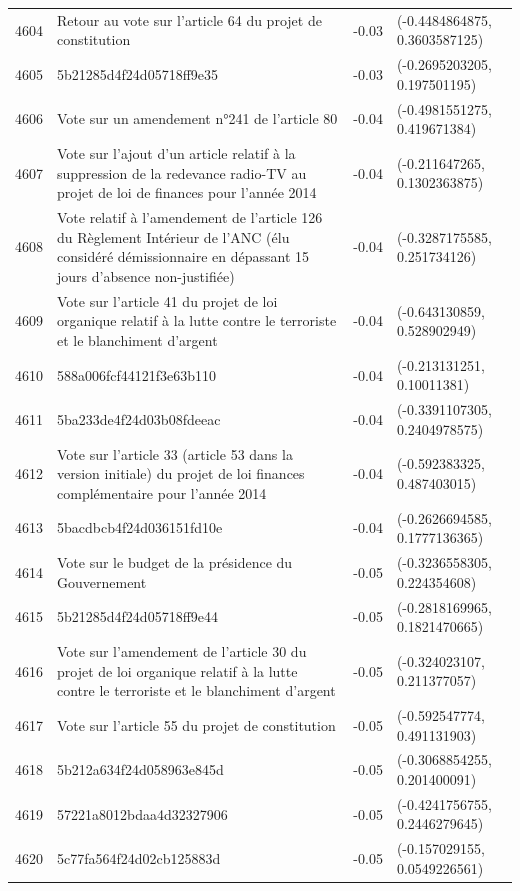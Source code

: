 \begin{table}[ht]
\begin{tabular}{rlrl}
  4604 & Retour au vote sur l'article 64 du projet de constitution & -0.03 & (-0.4484864875, 0.3603587125) \\ 
  4605 & 5b21285d4f24d05718ff9e35 & -0.03 & (-0.2695203205, 0.197501195) \\ 
  4606 & Vote sur un amendement n°241 de l'article 80 & -0.04 & (-0.4981551275, 0.419671384) \\ 
  4607 & Vote sur l'ajout d'un article relatif à la suppression de la redevance radio-TV au projet de loi de finances pour l'année 2014 & -0.04 & (-0.211647265, 0.1302363875) \\ 
  4608 & Vote relatif à l'amendement de l'article 126 du Règlement Intérieur de l'ANC (élu considéré démissionnaire en dépassant 15 jours d'absence non-justifiée) & -0.04 & (-0.3287175585, 0.251734126) \\ 
  4609 & Vote sur l'article 41 du projet de loi organique relatif à la lutte contre le terroriste et le blanchiment d'argent & -0.04 & (-0.643130859, 0.528902949) \\ 
  4610 & 588a006fcf44121f3e63b110 & -0.04 & (-0.213131251, 0.10011381) \\ 
  4611 & 5ba233de4f24d03b08fdeeac & -0.04 & (-0.3391107305, 0.2404978575) \\ 
  4612 & Vote sur l'article 33 (article 53 dans la version initiale) du projet de loi finances complémentaire pour l'année 2014 & -0.04 & (-0.592383325, 0.487403015) \\ 
  4613 & 5bacdbcb4f24d036151fd10e & -0.04 & (-0.2626694585, 0.1777136365) \\ 
  4614 & Vote sur le budget de la présidence du Gouvernement & -0.05 & (-0.3236558305, 0.224354608) \\ 
  4615 & 5b21285d4f24d05718ff9e44 & -0.05 & (-0.2818169965, 0.1821470665) \\ 
  4616 & Vote sur l'amendement de l'article 30 du projet de loi organique relatif à la lutte contre le terroriste et le blanchiment d'argent & -0.05 & (-0.324023107, 0.211377057) \\ 
  4617 & Vote sur l'article 55 du projet de constitution & -0.05 & (-0.592547774, 0.491131903) \\ 
  4618 & 5b212a634f24d058963e845d & -0.05 & (-0.3068854255, 0.201400091) \\ 
  4619 & 57221a8012bdaa4d32327906 & -0.05 & (-0.4241756755, 0.2446279645) \\ 
  4620 & 5c77fa564f24d02cb125883d & -0.05 & (-0.157029155, 0.0549226561) \\ 

\end{tabular}
\end{table}
